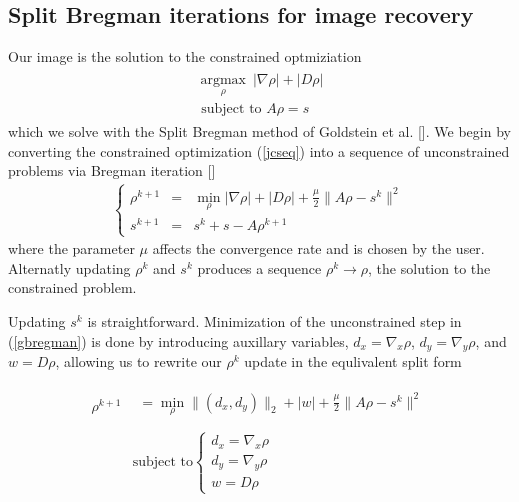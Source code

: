 \documentclass[11pt]{amsart}
\theoremstyle{remark}
\begin{document}
\subsection{Split Bregman iterations for image recovery}

Our image is the solution to the constrained optmiziation
\begin{align}\label{jcseq}
\begin{array}{c}
\underset{\rho}{\operatorname{argmax}} \:  | \nabla \rho| + | D \rho | \\
\text{ subject to } A \rho = s
\end{array}
\end{align}
which we solve with the Split Bregman method of Goldstein et al. []. We begin by converting the constrained optimization (\ref{jcseq}) into a sequence of unconstrained problems via Bregman iteration []
\begin{align}\label{gbregman}
\left\{
    \begin{array}{rcl}
\rho^{k+1} &=& \min_\rho | \nabla \rho| + | D \rho | + \frac{\mu}{2} \| A\rho - s^k \|^2 \\
s^{k+1} &=& s^k + s - A\rho^{k+1}
\end{array}
\right.
\end{align}
where the parameter $\mu$ affects the convergence rate and is chosen by the user. Alternatly updating $\rho^k$ and $s^k$ produces a sequence $\rho^k \rightarrow \rho$, the solution to the constrained problem.

Updating $s^k$ is straightforward. Minimization of the unconstrained step in (\ref{gbregman}) is done by introducing auxillary variables, $d_x = \nabla_x \rho$, $d_y = \nabla_y \rho$, and $w = D\rho$, allowing us to rewrite our $\rho^k$ update in the equlivalent split form

\begin{align}\label{spilt}
    \rho^{k+1} & \left.\begin{array}{l} = \min_\rho \|(d_x,d_y)\|_2 + | w | + \frac{\mu}{2} \| A\rho - s^k \|^2 \\ \end{array}\right. \\
        & 
\text{subject to} \left\{ \begin{array}{l}
       d_x = \nabla_x \rho  \\
       d_y = \nabla_y \rho  \\
       w = D \rho
    \end{array}\right. 
\end{align}
\end{document}
